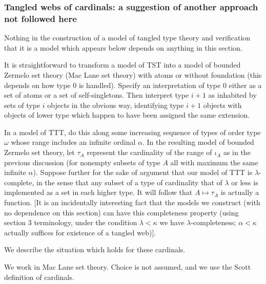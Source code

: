 \documentclass[112pt]{article}
\begin{document}
\newpage

\subsubsection{Tangled webs of cardinals:  a suggestion of another approach not followed here}

Nothing in the construction of a model of tangled type theory and verification that it is a model which appears below depends on anything in this section.

It is straightforward to transform a model of TST into a model of bounded Zermelo set theory (Mac Lane set theory) with atoms or without foundation
(this depends on how type 0 is handled).  Specify an interpretation of type 0 either as a set of atoms or a set of self-singletons.  Then interpret
type $i+1$ as inhabited by sets of type $i$ objects in the obvious way, identifying type $i+1$ objects with objects of lower type which happen to have been assigned the same extension.

In a model of TTT, do this along some increasing sequence of types of order type $\omega$ whose range includes an infinite ordinal $\alpha$.  In the resulting model of bounded Zermelo set theory,
let $\tau_A$ represent the cardinality of the range of $\iota_A$ as in the previous discussion (for nonempty subsets of type $A$ all with maximum the same infinite $\alpha$).  Suppose further for the sake of argument that our model of TTT is $\lambda$-complete, in the sense that any subset of a type of cardinality that of $\lambda$ or less is implemented as a set in each higher type.
It will follow that $A \mapsto \tau_A$ is actually a function. [It is an incidentally interesting fact that the models we construct (with no dependence on this section) can have this completeness property (using section 3 terminology, under the condition $\lambda<\kappa$ we have $\lambda$-completeness; $\alpha<\kappa$ actually suffices for existence of a tangled web)].

We describe the situation which holds for these cardinals.  

We work in Mac Lane set theory.  Choice is not assumed, and we use the Scott definition of cardinals.
\end{document}
